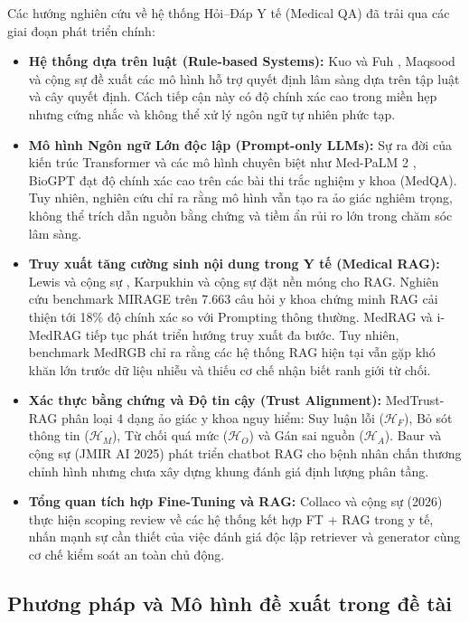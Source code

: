 \documentclass[12pt,a4paper]{article}
\begin{document}
Các hướng nghiên cứu về hệ thống Hỏi--Đáp Y tế (Medical QA) đã trải qua các giai đoạn phát triển chính:
\begin{itemize}[leftmargin=1.27cm]
    \item \textbf{Hệ thống dựa trên luật (Rule-based Systems):} Kuo và Fuh \cite{rule_based_1}, Maqsood và cộng sự \cite{rule_based_2} đề xuất các mô hình hỗ trợ quyết định lâm sàng dựa trên tập luật và cây quyết định. Cách tiếp cận này có độ chính xác cao trong miền hẹp nhưng cứng nhắc và không thể xử lý ngôn ngữ tự nhiên phức tạp.
    \item \textbf{Mô hình Ngôn ngữ Lớn độc lập (Prompt-only LLMs):} Sự ra đời của kiến trúc Transformer \cite{vaswani2017} và các mô hình chuyên biệt như Med-PaLM 2 \cite{singhal2023expert}, BioGPT \cite{luo2022biogpt} đạt độ chính xác cao trên các bài thi trắc nghiệm y khoa (MedQA). Tuy nhiên, nghiên cứu chỉ ra rằng mô hình vẫn tạo ra ảo giác nghiêm trọng, không thể trích dẫn nguồn bằng chứng và tiềm ẩn rủi ro lớn trong chăm sóc lâm sàng.
    \item \textbf{Truy xuất tăng cường sinh nội dung trong Y tế (Medical RAG):} Lewis và cộng sự \cite{lewis2020}, Karpukhin và cộng sự \cite{karpukhin2020} đặt nền móng cho RAG. Nghiên cứu benchmark MIRAGE \cite{xiong2024mirage} trên 7.663 câu hỏi y khoa chứng minh RAG cải thiện tới 18\% độ chính xác so với Prompting thông thường. MedRAG \cite{medrag2024} và i-MedRAG \cite{imedrag} tiếp tục phát triển hướng truy xuất đa bước. Tuy nhiên, benchmark MedRGB \cite{chen2024medrgb} chỉ ra rằng các hệ thống RAG hiện tại vẫn gặp khó khăn lớn trước dữ liệu nhiễu và thiếu cơ chế nhận biết ranh giới từ chối.
    \item \textbf{Xác thực bằng chứng và Độ tin cậy (Trust Alignment):} MedTrust-RAG \cite{medtrustrag} phân loại 4 dạng ảo giác y khoa nguy hiểm: Suy luận lỗi ($\mathcal{H}_F$), Bỏ sót thông tin ($\mathcal{H}_M$), Từ chối quá mức ($\mathcal{H}_O$) và Gán sai nguồn ($\mathcal{H}_A$). Baur và cộng sự (JMIR AI 2025) \cite{ortho_rag_13} phát triển chatbot RAG cho bệnh nhân chấn thương chỉnh hình nhưng chưa xây dựng khung đánh giá định lượng phân tầng.
    \item \textbf{Tổng quan tích hợp Fine-Tuning và RAG:} Collaco và cộng sự (2026) \cite{collaco2026} thực hiện scoping review về các hệ thống kết hợp FT + RAG trong y tế, nhấn mạnh sự cần thiết của việc đánh giá độc lập retriever và generator cùng cơ chế kiểm soát an toàn chủ động.
\end{itemize}

\subsection{Phương pháp và Mô hình đề xuất trong đề tài}
\end{document}

